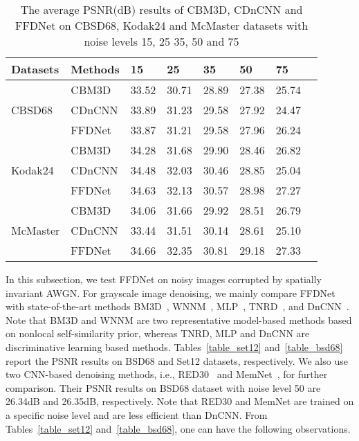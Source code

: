 \documentclass[journal]{IEEEtran}
\begin{document}
\begin{table}[!bp]\footnotesize{}
\caption{The average PSNR(dB) results of CBM3D, CDnCNN and FFDNet on CBSD68, Kodak24 and McMaster datasets with noise levels 15, 25 35, 50 and 75}
\center
\begin{tabular}{|p{1cm}<{\centering}|p{0.96cm}<{\centering}|p{.76cm}<{\centering}|p{.76cm}<{\centering}|p{.76cm}<{\centering}|p{.76cm}<{\centering}|p{.76cm}<{\centering}|p{.76cm}<{\centering}|}
  \hline\rowcolor[gray]{.9}
  Datasets & Methods &15&  25& 35  & 50 & 75 \\ \hline
   &CBM3D    & 33.52    & 30.71 &  28.89 & 27.38 & 25.74 \\
 CBSD68  &{CDnCNN} &33.89 &  31.23    & 29.58 & 27.92   & 24.47\\
  &FFDNet &33.87 &  31.21    & 29.58 & 27.96   & 26.24\\\hline

    & CBM3D   & 34.28    & 31.68 &  29.90 & 28.46 & 26.82 \\
    Kodak24 &{CDnCNN} &34.48 &  32.03    & 30.46 & 28.85   & 25.04\\
   & FFDNet&34.63 &  32.13    & 30.57 & 28.98   & 27.27\\\hline

  & CBM3D   & 34.06    & 31.66 &  29.92 & 28.51 & 26.79 \\
McMaster &{CDnCNN} &33.44 &  31.51    & 30.14 & 28.61  & 25.10\\
  & FFDNet  &34.66 &  32.35   & 30.81 & 29.18   & 27.33\\\hline
\end{tabular}
\label{table3}
\end{table}

In this subsection, we test FFDNet on noisy images corrupted by spatially invariant AWGN. For grayscale image denoising, we mainly compare FFDNet with state-of-the-art methods BM3D~\cite{dabov2007image}, WNNM~\cite{gu2014weighted}, MLP~\cite{burger2012image}, TNRD~\cite{chen2015trainable}, and DnCNN~\cite{zhang2017beyond}.
Note that BM3D and WNNM are two representative model-based methods based on nonlocal self-similarity prior, whereas TNRD, MLP and DnCNN are discriminative learning based methods. Tables~\ref{table_set12} and~\ref{table_bsd68} report the PSNR results on BSD68 and Set12 datasets, respectively.
We also use two CNN-based denoising methods, i.e., RED30~\cite{mao2016} and MemNet~\cite{tai2017memnet}, for further comparison. Their PSNR results on BSD68 dataset with noise level 50 are 26.34dB and 26.35dB, respectively. Note that RED30 and MemNet are trained on a specific noise level and are less efficient than DnCNN.
From Tables~\ref{table_set12} and~\ref{table_bsd68}, one can have the following observations.
\end{document}
